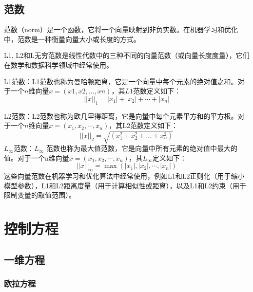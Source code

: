 \documentclass{article}
\numberwithin{equation}{subsection}    %
\begin{document}
\begin{appendix}
    \subsection{范数}
    范数（norm）是一个函数，它将一个向量映射到非负实数。在机器学习和优化中，范数是一种衡量向量大小或长度的方式。

    L1, L2和L无穷范数是线性代数中的三种不同的向量范数（或向量长度度量），它们在数学和数据科学领域中经常使用。

    L1范数：L1范数也称为曼哈顿距离，它是一个向量中每个元素的绝对值之和。对于一个$n$维向量$x = (x1, x2, ..., xn)$，其$L1$范数定义如下：
    \begin{equation}
        ||x||_1 = |x_1| + |x_2| + \cdots + |x_n|
    \end{equation}

    L2范数：L2范数也称为欧几里得距离，它是向量中每个元素平方和的平方根。对于一个$n$维向量$x = (x_1, x_2,\cdots, x_n)$，其L2范数定义如下：
    \begin{equation}
        ||x||_2 = \sqrt{(x_1^2 + x_2^2 + ... + x_n^2)}
    \end{equation}
    $L_\infty$范数：$L_\infty$ 范数也称为最大值范数，它是向量中所有元素的绝对值中最大的值。对于一个n维向量$x = (x_1, x_2,\cdots, x_n)$，其$L_\infty$定义如下：
    \begin{equation}
        ||x||_\infty = \max(|x_1|, |x_2|,\cdots, |x_n|)
    \end{equation}
    这些向量范数在机器学习和优化算法中经常使用，例如L1和L2正则化（用于缩小模型参数），L1和L2距离度量（用于计算相似性或距离），以及L1和L2约束（用于限制变量的取值范围）。
    \newpage
    \section{控制方程}
    \subsection{一维方程}
    \subsubsection{欧拉方程}

\end{appendix}
\end{document}
